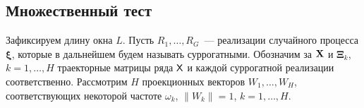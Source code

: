 \documentclass[specialist,
substylefile = spbu_report.rtx,
subf,href,colorlinks=true, 12pt]{disser}
\theoremstyle{definition}
\newtheorem{algorithm}{Алгоритм}
\newtheorem{remark}{Замечание}[section]
\begin{document}

\subsection{Множественный тест}\label{sect:multiple_test}
Зафиксируем длину окна $L$. Пусть $R_1, \ldots, R_G$~--- реализации случайного процесса $\bm\xi$, которые в дальнейшем будем называть суррогатными. Обозначим за $\mathbf{X}$ и $\bm\Xi_k$, $k=1,\ldots, H$ траекторные матрицы ряда $\mathsf{X}$ и каждой суррогатной реализации соответственно. Рассмотрим $H$ проекционных векторов $W_1,\ldots,W_H$, соответствующих некоторой частоте $\omega_k$, $\|W_k\|=1$, $k=1,\ldots,H$.
\end{document}

